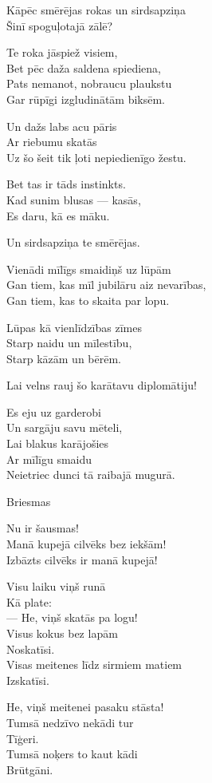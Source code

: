 \documentclass[14pt]{extarticle}
\begin{document}
Kāpēc smērējas rokas un sirdsapziņa\\
Šinī spoguļotajā zālē?

Te roka jāspiež visiem,\\
Bet pēc daža saldena spiediena,\\
Pats nemanot, nobraucu plaukstu\\
Gar rūpīgi izgludinātām biksēm.

Un dažs labs acu pāris\\
Ar riebumu skatās\\
Uz šo šeit tik ļoti nepiedienīgo žestu.

Bet tas ir tāds instinkts.\\
Kad sunim blusas --- kasās,\\
Es daru, kā es māku.

Un sirdsapziņa te smērējas.

Vienādi mīlīgs smaidiņš uz lūpām\\
Gan tiem, kas mīl jubilāru aiz nevarības,\\
Gan tiem, kas to skaita par lopu.

Lūpas kā vienlīdzības zīmes\\
Starp naidu un mīlestību,\\
Starp kāzām un bērēm.

Lai velns rauj šo karātavu diplomātiju!

Es eju uz garderobi\\
Un sargāju savu mēteli,\\
Lai blakus karājošies\\
Ar mīlīgu smaidu\\
Neietriec dunci tā raibajā mugurā.


\newpage

{\large \sc Briesmas}

Nu ir šausmas!\\
Manā kupejā cilvēks bez iekšām!\\
Izbāzts cilvēks ir manā kupejā!

Visu laiku viņš runā\\
Kā plate:\\
--- He, viņš skatās pa logu!\\
Visus kokus bez lapām\\
Noskatīsi.\\
Visas meitenes līdz sirmiem matiem\\
Izskatīsi.

He, viņš meitenei pasaku stāsta!\\
Tumsā nedzīvo nekādi tur\\
Tīģeri.\\
Tumsā noķers to kaut kādi\\
Brūtgāni.
\end{document}

